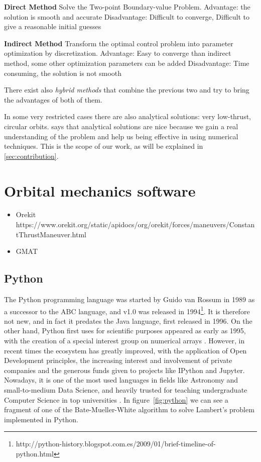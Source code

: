 \textbf{Direct Method}
Solve the Two-point Boundary-value Problem.
Advantage: the solution is smooth and accurate
Disadvantage: Difficult to converge, Difficult to give a reasonable initial guesses 

\textbf{Indirect Method}
Transform the optimal control problem into parameter 
optimization by discretization.
Advantage: Easy to converge than indirect method, some other optimization parameters can be added
Disadvantage: Time consuming, the solution is not smooth 

There exist also \textit{hybrid methods} that combine the previous two and try to bring the advantages of both of them.

In some very restricted cases there are also analytical solutions: very low-thrust, circular orbits. \cite{lawden1963optimal} says that analytical solutions are nice because we gain a real understanding of the problem and help us being effective in using numerical techniques. This is the scope of our work, as will be explained in \ref{sec:contribution}.

\section{Orbital mechanics software}

\begin{itemize}
\item Orekit https://www.orekit.org/static/apidocs/org/orekit/forces/maneuvers/ConstantThrustManeuver.html
\item GMAT 
\end{itemize}

\subsection{Python} \label{sec:python}

The Python programming language was started by Guido van Rossum in 1989 as a successor to the ABC language, and v1.0 was released in 1994\footnote{http://python-history.blogspot.com.es/2009/01/brief-timeline-of-python.html}. It is therefore not new, and in fact it predates the Java language, first released in 1996. On the other hand, Python first uses for scientific purposes appeared as early as 1995, with the creation of a special interest group on numerical arrays \cite{millman2011python}. However, in recent times the ecosystem has greatly improved, with the application of Open Development principles, the increasing interest and involvement of private companies and the generous funds given to projects like IPython \cite{perez2007ipython} and Jupyter. Nowadays, it is one of the most used languages in fields like Astronomy \cite{momcheva2015software} and small-to-medium Data Science, and heavily trusted for teaching undergraduate Computer Science in top universities \cite{guo2014python}. In figure~\ref{fig:python} we can see a fragment of one of the Bate-Mueller-White algorithm to solve Lambert's problem implemented in Python.


